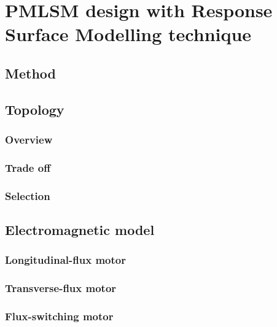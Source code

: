 \chapter{PMLSM design with Response Surface Modelling technique}   \label{Chapter:PMLSM design RSM}


\section{Method}                                \label{Chapter:PMLSM design RSM/method}


\section{Topology}                              \label{Chapter:PMLSM design RSM/topology}
    \subsection{Overview}                       \label{Chapter:PMLSM design RSM/topology/overview}
    \subsection{Trade off}                      \label{Chapter:PMLSM design RSM/topology/trade off}
    \subsection{Selection}                      \label{Chapter:PMLSM design RSM/topology/selection}


\section{Electromagnetic model}                 \label{Chapter:PMLSM design RSM/electromagnetic model}
    \subsection{Longitudinal-flux motor}        \label{Chapter:PMLSM design RSM/electromagnetic model/longitudinal flux}
    \subsection{Transverse-flux motor}          \label{Chapter:PMLSM design RSM/electromagnetic model/transverse flux}
    \subsection{Flux-switching motor}           \label{Chapter:PMLSM design RSM/electromagnetic model/flux switching}



